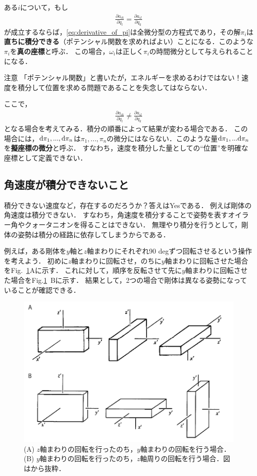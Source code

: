 \documentclass[a4j,10pt]{jsarticle}
\newcommand{\henbbn}[2]{\frac{\partial #1}{\partial #2}}
\begin{document}
ある$i$について，もし
\begin{align}
    \frac{\partial a_{ik}}{\partial q_l}=\frac{\partial a_{il}}{\partial q_k}
\end{align}
が成立するならば，\eqref{eq:derivative_of_pi}は全微分型の方程式であり，その解$\pi_i$は\textbf{直ちに積分できる}（ポテンシャル関数を求めればよい）ことになる．このような$\pi_i$を\textbf{真の座標}と呼ぶ．
この場合，$\omega_i$は正しく$\pi_i$の時間微分として与えられることになる．

\begin{itembox}{注意}
「ポテンシャル関数」と書いたが，エネルギーを求めるわけではない！速度を積分して位置を求める問題であることを失念してはならない．
\end{itembox}

ここで，
\begin{align}
    \henbbn{a_{ik}}{q_l}\neq\henbbn{a_{il}}{q_k}
\end{align}
となる場合を考えてみる．積分の順番によって結果が変わる場合である．
この場合には，${\rm d} \pi_1,...,{\rm d} \pi_n$は$\pi_1,...,\pi_n$の微分にはならない．このような量${\rm d} \pi_1,...{\rm d} \pi_n$を\textbf{擬座標の微分}と呼ぶ．
すなわち，速度を積分した量としての``位置''を明確な座標として定義できない．

\subsection{角速度が積分できないこと}
積分できない速度など，存在するのだろうか？答えはYesである．
例えば剛体の角速度は積分できない．
すなわち，角速度を積分することで姿勢を表すオイラー角やクォータニオンを得ることはできない．
無理やり積分を行うとして，剛体の姿勢は積分の経路に依存してしまうからである．

例えば，ある剛体を$y$軸と$z$軸まわりにそれぞれ90 degずつ回転させるという操作を考えよう．
初めに$z$軸まわりに回転させ，のちに$y$軸まわりに回転させた場合をFig.~\ref{fig:rotation}Aに示す．
これに対して，順序を反転させて先に$y$軸まわりに回転させた場合をFig.\ref{fig:rotation}~Bに示す．
結果として，2つの場合で剛体は異なる姿勢になっていることが確認できる．

\begin{figure}
    \centering
    \includegraphics[width=120mm]{rotation.pdf}
    \caption{(A) $z$軸まわりの回転を行ったのち，$y$軸まわりの回転を行う場合．(B) $y$軸まわりの回転を行ったのち，$z$軸周りの回転を行う場合．図は\cite{Goldstein}から抜粋．}
    \label{fig:rotation}
\end{figure}
\end{document}
